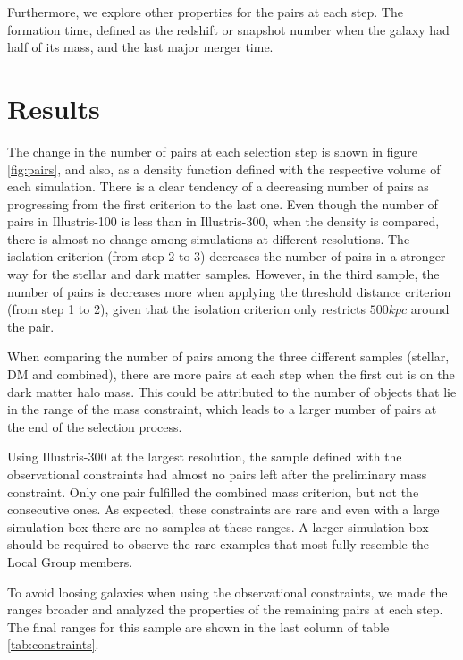 \documentclass[fleqn,usenatbib]{mnras}
\begin{document}
Furthermore, we explore other properties for the pairs at each step. The formation time, defined as the redshift or snapshot number when the galaxy had half of its mass, and the last major merger time.

\section{Results}
The change in the number of pairs at each selection step is shown in figure \ref{fig:pairs}, and also, as a density function defined with the respective volume of each simulation. There is a clear tendency of a decreasing number of pairs as progressing from the first criterion to the last one. Even though the number of pairs in Illustris-100 is less than in Illustris-300, when the density is compared, there is almost no change among simulations at different resolutions. The isolation criterion (from step 2 to 3) decreases the number of pairs in a stronger way for the stellar and dark matter samples. However, in the third sample, the number of pairs is decreases more when applying the threshold distance criterion (from step 1 to 2), given that the isolation criterion only restricts $500 kpc$ around the pair.

When comparing the number of pairs among the three different samples (stellar, DM and combined), there are more pairs at each step when the first cut is on the dark matter halo mass. This could be attributed to the number of objects that lie in the range of the mass constraint, which leads to a larger number of pairs at the end of the selection process. 

Using Illustris-300 at the largest resolution, the sample defined with the observational constraints had almost no pairs left after the preliminary mass constraint. Only one pair fulfilled the combined mass criterion, but not the consecutive ones. As expected, these constraints are rare and even with a large simulation box there are no samples at these ranges. A larger simulation box should be required to observe the rare examples that most fully resemble the Local Group members. 

To avoid loosing galaxies when using the observational constraints, we made the ranges broader and analyzed the properties of the remaining pairs at each step. The final ranges for this sample are shown in the last column of table \ref{tab:constraints}.
\end{document}
